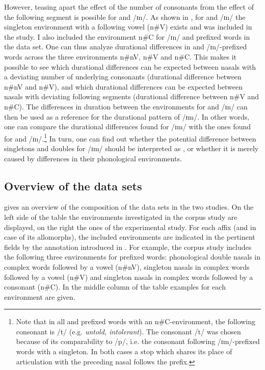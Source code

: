 However, teasing apart the effect of the number of consonants from the effect of the following segment is possible for  and /ɪn/. As shown in , for  and /ɪn/ the singleton environment with a following vowel (n\#V) exists and was included in the study. I also included the environment n\#C for /ɪn/ and prefixed words in the data set.
 One can thus analyze durational differences in  and /ɪn/-prefixed words across the three environments  n\#nV, n\#V and n\#C. 
This makes it possible to see which durational differences can be expected between nasals with a deviating number of underlying consonants (durational difference between n\#nV and n\#V), and which durational differences can be expected between nasals with deviating following segments (durational difference between n\#V and n\#C). 
The differences in duration between the environments for  and /ɪn/ can then be used as a reference for the durational pattern of /ɪm/. 
In other words, one can compare the durational differences found for /ɪm/ with the ones found for  and /ɪn/.\footnote{Note that in all  and  prefixed words with an n\#C-environment, the following consonant is /t/ (e.g. \textit{untold, intolerant}). The consonant /t/ was chosen because of its comparability to /p/, i.e. the consonant following /ɪm/-prefixed words with a singleton. In both cases a stop which shares its place of articulation with the preceding nasal follows the prefix.}
In turn, one can find out whether the potential difference between singletons and doubles for /ɪm/ should be interpreted as , or whether it is merely caused by differences in their phonological environments.





%
\subsection{Overview of the data sets}

 gives an overview of the composition of the data sets in the two studies.
On the left side of the table the environments investigated in the corpus study are displayed, on the right the ones of the experimental study. 
For each affix (and in case of   its allomorphs), the included environments are indicated in the pertinent fields by the annotation introduced in .
For example, the corpus study includes the following three environments for prefixed words: phonological double nasals in complex words followed by a vowel (n\#nV), singleton nasals in complex words followed by a vowel (n\#V) and singleton nasals in complex words followed by a consonant (n\#C). In the middle column of the table examples for each environment are given.

